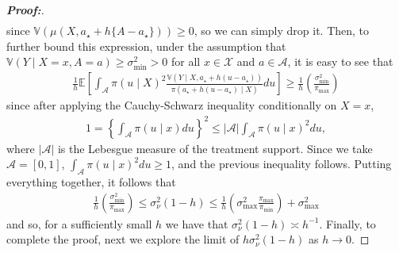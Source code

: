 \documentclass[11pt,twoside]{article}
\theoremstyle{definition}
\theoremstyle{remark}
\begin{document}
\begin{proof}[\textbf{Proof:}]
\begin{align*}
\end{align*}
since $\mathbb{V}(\mu(X, a_\star + h\{A - a_\star\})) \geq 0$, so we can simply drop it. Then, to further bound this expression, under the assumption that $\mathbb{V}(Y \mid X = x, A = a) \geq \sigma^2_{\min} > 0$ for all $x \in \mathcal{X}$ and $a \in \mathcal{A}$, it is easy to see that 
\begin{align*}
    \frac{1}{h} \mathbb{E}\left[\int_\mathcal{A}\pi(u \! \mid \! X)^2 \frac{\mathbb{V}(Y \mid X, a_\star + h(u - a_\star))}{\pi(a_\star + h(u - a_\star) \! \mid \! X)}  du \right] \geq \frac{1}{h}\left(\frac{\sigma^2_{\min}}{\pi_{\max}} \right) 
\end{align*}
since after applying the Cauchy-Schwarz inequality conditionally on $X = x$,
\begin{align*}
    1 = \left\{\int_{\mathcal{A}} \pi(u \! \mid \! x) du\right\}^2 \leq |\mathcal{A}| \int_{\mathcal{A}} \pi(u \! \mid \! x)^2 du,
\end{align*}
where $|\mathcal{A}|$ is the Lebesgue measure of the treatment support. Since we take $\mathcal{A} = [0, 1]$, $\int_{\mathcal{A}} \pi(u \! \mid \! x)^2 du \geq 1$, and the previous inequality follows. Putting everything together, it follows that
\begin{align*}
    \frac{1}{h}\left(\frac{\sigma^2_{\min}}{\pi_{\max}} \right) \leq \sigma^2_\nu(1-h) \leq \frac{1}{h}\left(\sigma^2_{\max} \frac{\pi_{\max}}{\pi_{\min}} \right) + \sigma^2_{\max}
\end{align*}
and so, for a sufficiently small $h$ we have that $\sigma^2_\nu(1-h) \asymp h^{-1}$. Finally, to complete the proof, next we explore the limit of $h \sigma^2_\nu(1-h)$ as $h \to 0$. \bigskip 


\end{proof}
\end{document}
